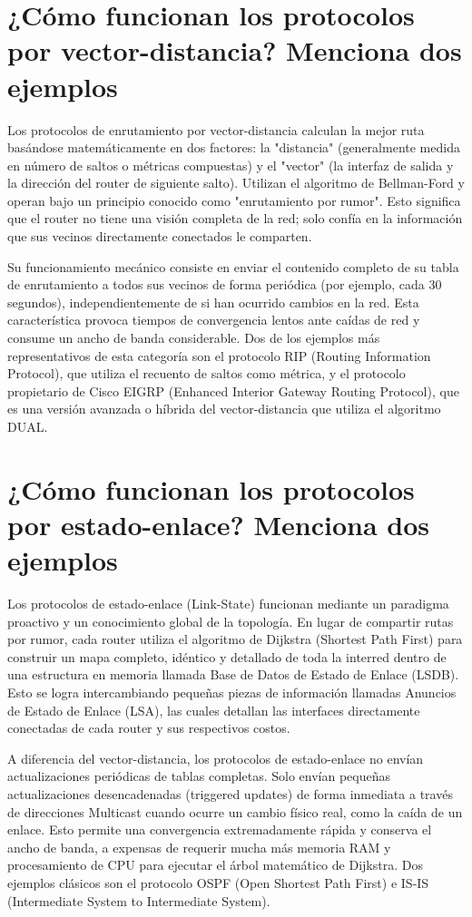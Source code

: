 \documentclass[a4paper,12pt]{article}
\begin{document}
\section{¿Cómo funcionan los protocolos por vector-distancia? Menciona dos ejemplos}

Los protocolos de enrutamiento por vector-distancia calculan la mejor ruta basándose matemáticamente en dos factores: la "distancia" (generalmente medida en número de saltos o métricas compuestas) y el "vector" (la interfaz de salida y la dirección del router de siguiente salto). Utilizan el algoritmo de Bellman-Ford y operan bajo un principio conocido como "enrutamiento por rumor". Esto significa que el router no tiene una visión completa de la red; solo confía en la información que sus vecinos directamente conectados le comparten.

Su funcionamiento mecánico consiste en enviar el contenido completo de su tabla de enrutamiento a todos sus vecinos de forma periódica (por ejemplo, cada 30 segundos), independientemente de si han ocurrido cambios en la red. Esta característica provoca tiempos de convergencia lentos ante caídas de red y consume un ancho de banda considerable. Dos de los ejemplos más representativos de esta categoría son el protocolo RIP (Routing Information Protocol), que utiliza el recuento de saltos como métrica, y el protocolo propietario de Cisco EIGRP (Enhanced Interior Gateway Routing Protocol), que es una versión avanzada o híbrida del vector-distancia que utiliza el algoritmo DUAL.

\section{¿Cómo funcionan los protocolos por estado-enlace? Menciona dos ejemplos}

Los protocolos de estado-enlace (Link-State) funcionan mediante un paradigma proactivo y un conocimiento global de la topología. En lugar de compartir rutas por rumor, cada router utiliza el algoritmo de Dijkstra (Shortest Path First) para construir un mapa completo, idéntico y detallado de toda la interred dentro de una estructura en memoria llamada Base de Datos de Estado de Enlace (LSDB). Esto se logra intercambiando pequeñas piezas de información llamadas Anuncios de Estado de Enlace (LSA), las cuales detallan las interfaces directamente conectadas de cada router y sus respectivos costos.

A diferencia del vector-distancia, los protocolos de estado-enlace no envían actualizaciones periódicas de tablas completas. Solo envían pequeñas actualizaciones desencadenadas (triggered updates) de forma inmediata a través de direcciones Multicast cuando ocurre un cambio físico real, como la caída de un enlace. Esto permite una convergencia extremadamente rápida y conserva el ancho de banda, a expensas de requerir mucha más memoria RAM y procesamiento de CPU para ejecutar el árbol matemático de Dijkstra. Dos ejemplos clásicos son el protocolo OSPF (Open Shortest Path First) e IS-IS (Intermediate System to Intermediate System).
\end{document}
